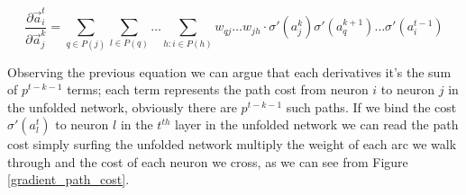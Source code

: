 \begin{equation} 
\frac{\partial \vec{a}_i^t}{\partial \vec{a}_j^k} = \sum_{q\in P(j)} \sum_{l \in P(q)} \hdots \sum_{h : i \in P(h)} w_{qj} \hdots w_{jh} \cdot \sigma'(a_j^k)\sigma'(a_q^{k+1}) \hdots \sigma'(a_i^{t-1})
\label{expanded_mem}
\end{equation}


Observing the previous equation we can argue that each derivatives it's the sum of $p^{t-k-1}$ terms; each term represents the path cost from neuron $i$ to neuron $j$ in the unfolded network, obviously
there are $p^{t-k-1}$ such paths. If we bind the cost $\sigma'(a_l^t)$ to neuron $l$ in the $t^{th}$ layer in the unfolded network we can read the path cost simply surfing the unfolded network multiply
the weight of each arc we walk through and the cost of each neuron we cross, as we can see from Figure \ref{gradient_path_cost}.


